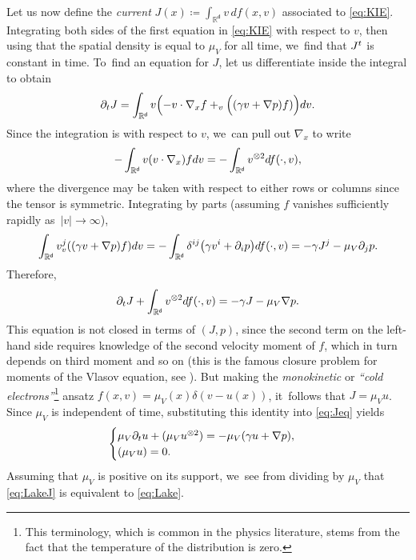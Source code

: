 \documentclass[10pt]{amsart}
\theoremstyle{plain}
\theoremstyle{definition}
\DeclarePairedDelimiter{\pa}{\lparen}{\rparen}
\let\div\relax
\DeclareMathOperator{\div}{\mathrm{div}}
\newcommand{\R}{{\mathbb{R}}}
\let\ga\gamma
\let\nab\nabla
\let\p\partial
\renewcommand{\d}{\mathsf{d}}
\begin{document}
Let us now define the \emph{current} $J(x)\coloneqq \int_{\R^\d}v\, df(x,v)$ associated to \eqref{eq:KIE}. Integrating both sides of the first equation in \eqref{eq:KIE} with respect to {$v$}, then using that the spatial density is equal to $\mu_V$ for all time, we~find that {$\div J^t$ is constant in time}. To~find an equation for $J$, let us differentiate inside the integral to obtain
\begin{equation*}
\p_t J = \int_{\R^\d}v\pa*{-v\cdot\nabla_x f + \div_v\Big((\ga v + \nab p) f)}dv.
\end{equation*}
Since the integration is with respect to $v$, we~can pull out $\nabla_x$ to write
\begin{equation*}
-\int_{\R^\d}v (v\cdot\nabla_x)fdv = -\div\int_{\R^\d}v^{\otimes 2}df(\cdot,v),
\end{equation*}
where the divergence may be taken with respect to either rows or columns since the tensor is symmetric. Integrating by parts (assuming $f$ vanishes sufficiently rapidly as~$|v|\to\infty$),
\begin{equation*}
\int_{\R^\d}v^j\div_v\pa*{(\ga v +\nabla p)f}dv = -\int_{\R^\d}\delta^{ij}\pa*{\ga v^i+\p_{i}p}df(\cdot,v) = -\ga J^j -\mu_V\p_{j}p.
\end{equation*}
Therefore,
\begin{equation}\label{eq:Jeq}
\p_t J + \div\int_{\R^\d}v^{\otimes 2}df(\cdot,v) = -\ga J -\mu_V\nabla p.
\end{equation}
This equation is not closed in terms of $(J,p)$, since the second term on the left-hand side requires knowledge of the second velocity moment of $f$, {which in turn depends on third moment and so on} (this is the famous closure problem for moments of the Vlasov equation, \eg see \cite{Uhlemann2018}). But making the \emph{monokinetic} or \emph{``cold electrons''}\footnote{This terminology, which is common in the physics literature, stems from the fact that the temperature of the distribution is zero.} ansatz $f(x,v)=\mu_V(x)\delta(v-u(x))$, it~follows that $J=\mu_V u$. Since $\mu_V$ is independent of time, substituting this identity into \eqref{eq:Jeq} yields
\begin{equation}\label{eq:LakeJ}
\begin{cases}
\mu_V\p_t u +\div(\mu_V u^{\otimes 2}) = -\mu_V\pa*{\ga u+\nabla p},\\
\div(\mu_V u) = 0.
\end{cases}
\end{equation}
Assuming that $\mu_V$ is positive on its support, we~see from dividing by $\mu_V$ that \eqref{eq:LakeJ} is equivalent to \smallskip \eqref{eq:Lake}.
\end{document}

